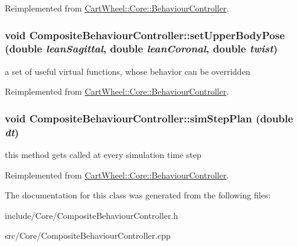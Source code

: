 Reimplemented from \hyperlink{classCartWheel_1_1Core_1_1BehaviourController_a335b40febfbe741f290367a2ad59b38a}{CartWheel::Core::BehaviourController}.

\hypertarget{classCartWheel_1_1Core_1_1CompositeBehaviourController_a0c01e07f056c9af2c59c354471859d29}{
\subsubsection[{setUpperBodyPose}]{\setlength{\rightskip}{0pt plus 5cm}void CompositeBehaviourController::setUpperBodyPose (double {\em leanSagittal}, \/  double {\em leanCoronal}, \/  double {\em twist})}}
\label{classCartWheel_1_1Core_1_1CompositeBehaviourController_a0c01e07f056c9af2c59c354471859d29}
a set of useful virtual functions, whose behavior can be overridden 

Reimplemented from \hyperlink{classCartWheel_1_1Core_1_1BehaviourController_a1086038c78bc9cd190699d7756285b03}{CartWheel::Core::BehaviourController}.

\hypertarget{classCartWheel_1_1Core_1_1CompositeBehaviourController_afaba80fe489ca6a997e33551d94a6db1}{
\subsubsection[{simStepPlan}]{\setlength{\rightskip}{0pt plus 5cm}void CompositeBehaviourController::simStepPlan (double {\em dt})}}
\label{classCartWheel_1_1Core_1_1CompositeBehaviourController_afaba80fe489ca6a997e33551d94a6db1}
this method gets called at every simulation time step 

Reimplemented from \hyperlink{classCartWheel_1_1Core_1_1BehaviourController_a5a0b7293c3693f7a5860ae51bb65164e}{CartWheel::Core::BehaviourController}.



The documentation for this class was generated from the following files:\begin{DoxyCompactItemize}
\item 
include/Core/CompositeBehaviourController.h\item 
src/Core/CompositeBehaviourController.cpp\end{DoxyCompactItemize}
